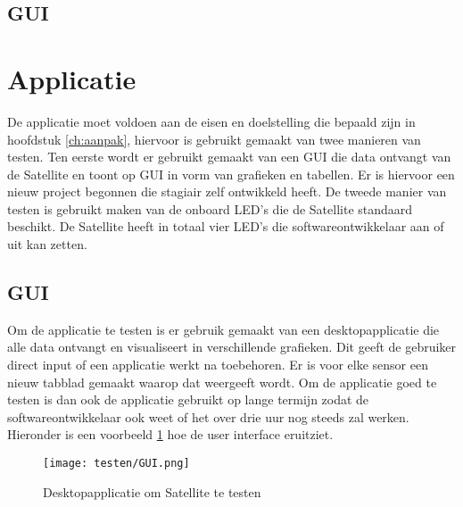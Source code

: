 \newpage

\subsection{GUI}
\section{Applicatie}
De applicatie moet voldoen aan de eisen en doelstelling die bepaald zijn in hoofdstuk \ref{ch:aanpak}, hiervoor is gebruikt gemaakt van twee manieren van testen. Ten eerste wordt er gebruikt gemaakt van een GUI die data ontvangt van de Satellite en toont op GUI in vorm van grafieken en tabellen. Er is hiervoor een nieuw project begonnen die stagiair zelf ontwikkeld heeft. De tweede manier van testen is gebruikt maken van de onboard LED's die de Satellite standaard beschikt. De Satellite heeft in totaal vier LED's die softwareontwikkelaar aan of uit kan zetten. 



\subsection{GUI}
Om de applicatie te testen is er gebruik gemaakt van een desktopapplicatie die alle data ontvangt en visualiseert in verschillende grafieken. Dit geeft de gebruiker direct input of een applicatie werkt na toebehoren. Er is voor elke sensor een nieuw tabblad gemaakt waarop dat weergeeft wordt. Om de applicatie goed te testen is dan ook de applicatie gebruikt op lange termijn zodat de softwareontwikkelaar ook weet of het over drie uur nog steeds zal werken. Hieronder is een voorbeeld \ref{fig:guitest} hoe de user interface eruitziet. 
\begin{figure}[h!]
	\centering

	\label{fig:guitest}
	\texttt{[image: testen/GUI.png]}
	\caption{Desktopapplicatie om Satellite te testen}
\end{figure}

\newpage
